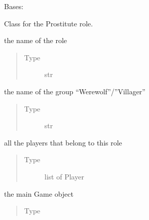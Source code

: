 \documentclass[letterpaper,10pt,english]{sphinxmanual}
\begin{document}
\begin{fulllineitems}
Bases: 

Class for the Prostitute role.


\begin{fulllineitems}
the name of the role
\begin{quote}\begin{description}
\item[{Type}] \leavevmode
str

\end{description}\end{quote}

\end{fulllineitems}



\begin{fulllineitems}
the name of the group “Werewolf”/”Villager”
\begin{quote}\begin{description}
\item[{Type}] \leavevmode
str

\end{description}\end{quote}

\end{fulllineitems}



\begin{fulllineitems}
all the players that belong to this role
\begin{quote}\begin{description}
\item[{Type}] \leavevmode
list of Player

\end{description}\end{quote}

\end{fulllineitems}



\begin{fulllineitems}
the main Game object
\begin{quote}\begin{description}
\item[{Type}] \leavevmode
{\hyperref[\detokenize{chatwolf:chatwolf.game.Game}]{}}


\end{description}
\end{quote}
\end{fulllineitems}
\end{fulllineitems}
\end{document}
